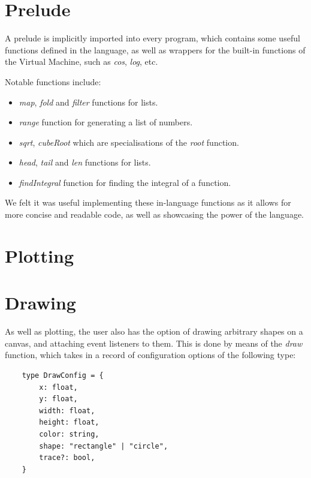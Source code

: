 

\section{Prelude}\label{sec:prelude}

A prelude is implicitly imported into every program, which contains some useful functions defined in the language, as 
well as wrappers for the built-in functions of the Virtual Machine, such as \textit{cos}, \textit{log}, etc.

Notable functions include:

\begin{itemize}
    \item \textit{map}, \textit{fold} and \textit{filter} functions for lists.
    \item \textit{range} function for generating a list of numbers.
    \item \textit{sqrt}, \textit{cubeRoot} which are specialisations of the \textit{root} function.
    \item \textit{head}, \textit{tail} and \textit{len} functions for lists.
    \item \textit{findIntegral} function for finding the integral of a function.
\end{itemize}

We felt it was useful implementing these in-language functions as it allows for more concise and readable code, as
well as showcasing the power of the language.

\section{Plotting}\label{sec:plotting}



\section{Drawing}\label{sec:drawing}

As well as plotting, the user also has the option of drawing arbitrary shapes on a canvas, and attaching event 
listeners to them.
This is done by means of the \textit{draw} function, which takes in a record of configuration options of the following
type:

\begin{verbatim}
    type DrawConfig = {
        x: float,
        y: float,
        width: float,
        height: float,
        color: string,
        shape: "rectangle" | "circle",
        trace?: bool, 
    }
\end{verbatim}

